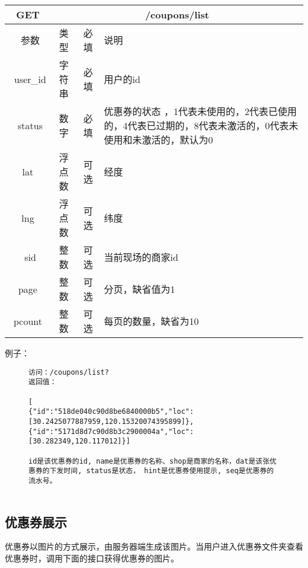 \begin{table}[H]
   \begin{center}
\begin{tabular}{|c|c|c|p{12cm}|}
\hline
GET & \multicolumn{3}{|c|}{/coupons/list} \\
\hline\hline
 \  参数  & 类型 & 必填 &  说明  \\
\hline
 \  user\_id  & 字符串 & 必填 &  用户的id  \\
\hline
 \  status  & 数字 & 必填 &  优惠券的状态 ，1代表未使用的，2代表已使用的，4代表已过期的，8代表未激活的，0代表未使用和未激活的，默认为0\\
\hline
 lat  & 浮点数 & 可选 & 经度\\
\hline
 lng  &  浮点数 & 可选 & 纬度\\ 
 \hline
 \ sid  &  整数 & 可选 & 当前现场的商家id\\ 
  \hline
 page  & 整数 & 可选 & 分页，缺省值为1\\ 
 \hline
 pcount  & 整数 & 可选 & 每页的数量，缺省为10\\ 
\hline
\end{tabular}
   \end{center}
\end{table}


例子：

\begin{figure}[H]
\begin{verbatim}
访问：/coupons/list?
返回值：

[
{"id":"518de040c90d8be6840000b5","loc":[30.2425077887959,120.15320074395899]},
{"id":"5171d8d7c90d8b3c2900004a","loc":[30.282349,120.117012]}]

id是该优惠券的id, name是优惠券的名称、shop是商家的名称，dat是该张优惠券的下发时间, status是状态， hint是优惠券使用提示, seq是优惠券的流水号。
 
\end{verbatim}
\end{figure}





 

\subsection{优惠券展示}
优惠券以图片的方式展示，由服务器端生成该图片。当用户进入优惠券文件夹查看优惠券时，调用下面的接口获得优惠券的图片。

